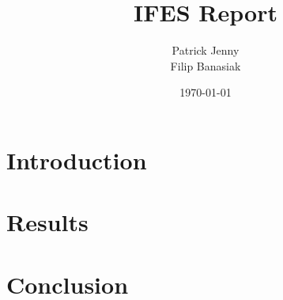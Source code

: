 \documentclass{report_class}
\title{IFES Report}
\author{Patrick Jenny\\Filip Banasiak}
\date{\today}
\begin{document}
	\maketitle
	
	
	\tableofcontents
	\newpage
	
	
	\newpage

	\clearpage
	
	\section{Introduction}
	
	\newpage

	\section{Results}
		
		\newpage

		
		\newpage

		
		\newpage

	\section{Conclusion}
	
	\newpage

	
	\newpage


	\listoftables
	\listoffigures
\end{document}
